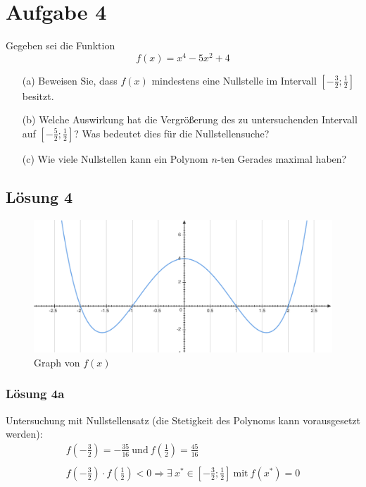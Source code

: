 \documentclass[main.tex]{subfiles}
\begin{document}
\section{Aufgabe 4}
Gegeben sei die Funktion
\begin{equation*}
    f(x) =x^{4} -5x^{2} + 4
\end{equation*}

\begin{enumerate}
    \item[(a)] Beweisen Sie, dass $f(x)$ mindestens eine Nullstelle im Intervall $\left[ -\frac{3}{2} ;\frac{1}{2}\right]$ besitzt.
    \item[(b)] Welche Auswirkung hat die Vergrößerung des zu untersuchenden Intervall auf $\left[ -\frac{5}{2} ;\frac{1}{2}\right]$? Was bedeutet dies für die Nullstellensuche?
    \item[(c)] Wie viele Nullstellen kann ein Polynom $n$-ten Gerades maximal haben?
\end{enumerate}

\subsection{Lösung 4}

\begin{figure}[ht]
	\includegraphics[width=\linewidth]{fig-4a.pdf}
	\caption{Graph von $f(x)$}
\end{figure}

\subsubsection{Lösung 4a}
Untersuchung mit Nullstellensatz (die Stetigkeit des Polynoms kann vorausgesetzt werden):
\begin{gather*}
    f\left( -\frac{3}{2}\right) =-\frac{35}{16} \ \text{und} \ f\left(\frac{1}{2}\right) =\frac{45}{16}\\
    \\
    f\left( -\frac{3}{2}\right) \cdot f\left(\frac{1}{2}\right) < 0\Longrightarrow \exists \ x^{*} \in \left[ -\frac{3}{2} ;\frac{1}{2}\right] \ \text{mit} \ f\left( x^{*}\right) =0
\end{gather*}
\end{document}

